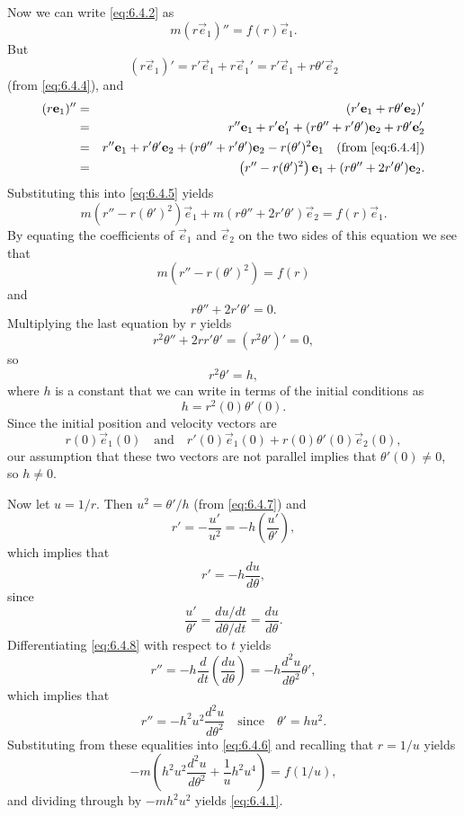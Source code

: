 \documentclass{ximera}
\begin{document}
Now we can write \eqref{eq:6.4.2} as
\begin{equation} \label{eq:6.4.5}
m(r\vec{e}_1)''=f(r)\vec{e}_1.
\end{equation}
But
$$
(r\vec{e}_1)'=r'\vec{e}_1+r\vec{e}_1'=r'\vec{e}_1+r\theta'\vec{e}_2
$$
(from \eqref{eq:6.4.4}), and
\begin{eqnarray*}
(r\vec{e}_1)''&=&(r'\vec{e}_1+r\theta'\vec{e}_2)'\\
&=&r''\vec{e}_1+r'\vec{e}_1'+(r\theta''+r'\theta')\vec{e}_2
+r\theta'\vec{e}_2'\\
&=&r''\vec{e}_1+r'\theta'\vec{e}_2+(r\theta''+r'\theta')\vec{e}_2 -r(\theta')^2\vec{e}_1\quad\mbox{(from \eqref{eq:6.4.4})}\\
&=&\left(r''-r(\theta')^2\right)\vec{e}_1+(r\theta''+2r'\theta')\vec{e}_2.
\end{eqnarray*}
Substituting this into \eqref{eq:6.4.5} yields
$$
m\left(r''-r(\theta')^2\right)\vec{e}_1+m(r\theta''+2r'\theta')\vec{e}_2=f(r)\vec{e}_1.
$$
By equating the coefficients of $\vec{e}_1$ and $\vec{e}_2$ on the
two sides of this equation we see that
\begin{equation} \label{eq:6.4.6}
m\left(r''-r(\theta')^2\right)=f(r)
\end{equation}
and
$$
r\theta''+2r'\theta'=0.
$$
Multiplying the last equation by $r$ yields
$$
r^2\theta''+2rr'\theta'=(r^2\theta')'=0,
$$
so
\begin{equation} \label{eq:6.4.7}
r^2\theta'=h,
\end{equation}
where $h$ is a constant that we can write in terms of the initial
conditions as
$$
h=r^2(0)\theta'(0).
$$
Since the initial position and velocity vectors are
$$
 r(0)\vec{e}_1(0)\quad\mbox{and}\quad
r'(0)\vec{e}_1(0)+r(0)\theta'(0)\vec{e}_2(0),
$$
our assumption that these two vectors are not parallel implies that
$\theta'(0)\neq 0$, so $h\neq 0$.





Now let $u=1/r$.
Then  $u^2=\theta'/h$ (from \eqref{eq:6.4.7}) and
$$
r'=-\frac{u'}{u^2}=-h\left(\frac{u'}{\theta'}\right),
$$
which implies that
\begin{equation} \label{eq:6.4.8}
r'=-h\frac{du}{d\theta},
\end{equation}
since
$$
\frac{u'}{\theta'}=\frac{du/dt}{d\theta/dt}=\frac{du}{d\theta}.
$$
Differentiating \eqref{eq:6.4.8} with respect to $t$ yields
$$
r''=-h\frac{d}{dt}\left(\frac{du}{d\theta}\right)
=-h\frac{d^2u}{d\theta^2}\theta',
$$
which implies that
$$
r''=-h^2u^2\frac{d^2u}{d\theta^2}
\quad\mbox{since}\quad \theta'=hu^2.
$$
Substituting from these equalities into
\eqref{eq:6.4.6} and recalling that $r=1/u$ yields
$$
-m\left(h^2u^2\frac{d^2u}{d\theta^2}+\frac{1}{u}h^2u^4\right)
=f(1/u),
$$
and dividing through by $-mh^2u^2$ yields \eqref{eq:6.4.1}.
\end{document}

